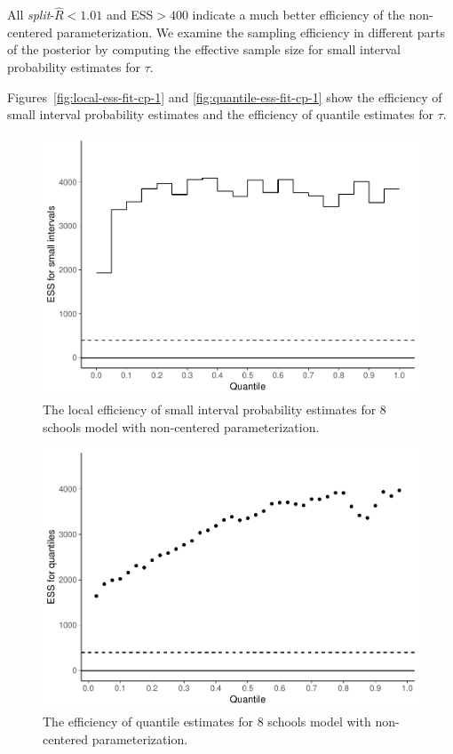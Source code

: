 \documentclass[american,]{article}
\begin{document}

All \emph{split}-\(\widehat{R}<1.01\) and ESS\(>400\) indicate a much
better efficiency of the non-centered parameterization.
%
We examine the sampling efficiency in different parts of the posterior
by computing the effective sample size for small interval probability
estimates for $\tau$.

Figures~\ref{fig:local-ess-fit-cp-1} and
\ref{fig:quantile-ess-fit-cp-1} show the efficiency of small interval
probability estimates and the efficiency of quantile estimates for
$\tau$.
\begin{figure}[tp]
  \centering
  \includegraphics[width=0.6\linewidth]{graphics/local-ess-fit-ncp2-1.pdf}
  \caption{The local efficiency of small interval probability estimates for 8 schools model with non-centered parameterization.}
  \label{fig:local-ess-fit-ncp2-1}
\end{figure}
\begin{figure}[tp]
  \centering
  \includegraphics[width=0.6\linewidth]{graphics/quantile-ess-fit-ncp2-1.pdf}
  \caption{The efficiency of quantile estimates for 8 schools model with non-centered parameterization.}
  \label{fig:quantile-ess-fit-ncp2-1}
\end{figure}
\end{document}
